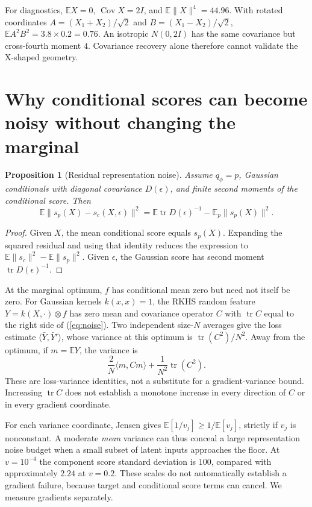 \documentclass[11pt,a4paper]{article}
\newtheorem{proposition}{Proposition}[section]
\numberwithin{equation}{section}
\newcommand{\E}{\mathbb E}
\newcommand{\Cov}{\operatorname{Cov}}
\newcommand{\tr}{\operatorname{tr}}
\begin{document}
For diagnostics, $\E X=0$, $\Cov X=2I$, and $\E\|X\|^4=44.96$.
With rotated coordinates $A=(X_1+X_2)/\sqrt2$ and
$B=(X_1-X_2)/\sqrt2$, $\E A^2B^2=3.8\times0.2=0.76$.
An isotropic $N(0,2I)$ has the same covariance but cross-fourth moment $4$.
Covariance recovery alone therefore cannot validate the X-shaped geometry.

\section{Why conditional scores can become noisy without changing the marginal}
\begin{proposition}[Residual representation noise]
Assume $q_\phi=p$, Gaussian conditionals with diagonal covariance
$D(\epsilon)$, and finite second moments of the conditional score. Then
\begin{equation}
 \E\|s_p(X)-s_c(X,\epsilon)\|^2
 =\E\tr D(\epsilon)^{-1}-\E_p\|s_p(X)\|^2.
 \label{eq:noise}
\end{equation}
\end{proposition}
\begin{proof}
Given $X$, the mean conditional score equals $s_p(X)$. Expanding the
squared residual and using that identity reduces the expression to
$\E\|s_c\|^2-\E\|s_p\|^2$. Given $\epsilon$, the Gaussian score has
second moment $\tr D(\epsilon)^{-1}$.
\end{proof}
At the marginal optimum, $f$ has conditional mean zero but need not itself
be zero. For Gaussian kernels $k(x,x)=1$, the RKHS random feature
$Y=k(X,\cdot)\otimes f$ has zero mean and covariance operator $C$ with
$\tr C$ equal to the right side of (\ref{eq:noise}). Two independent
size-$N$ averages give the loss estimate $\langle\bar Y,\bar Y'\rangle$,
whose variance at this optimum is $\tr(C^2)/N^2$. Away from the optimum,
if $m=\E Y$, the variance is
\[
 \frac{2}{N}\langle m,Cm\rangle+\frac{1}{N^2}\tr(C^2).
\]
These are loss-variance identities, not a substitute for a gradient-variance
bound. Increasing $\tr C$ does not establish a monotone increase in every
direction of $C$ or in every gradient coordinate.

For each variance coordinate, Jensen gives
$\E[1/v_j]\geq1/\E[v_j]$, strictly if $v_j$ is nonconstant.
A moderate \emph{mean} variance can thus conceal a large representation
noise budget when a small subset of latent inputs approaches the floor.
At $v=10^{-4}$ the component score standard deviation is $100$, compared
with approximately $2.24$ at $v=0.2$. These scales do not automatically
establish a gradient failure, because target and conditional score terms
can cancel. We measure gradients separately.
\end{document}
